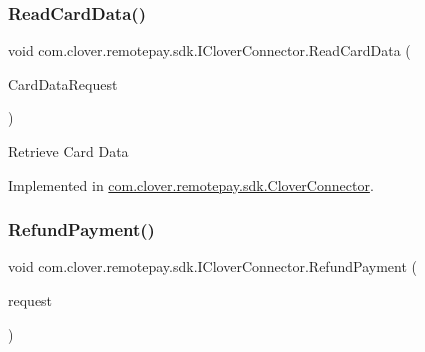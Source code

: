 \mbox{\label{interfacecom_1_1clover_1_1remotepay_1_1sdk_1_1_i_clover_connector_a841db6225c6a5df5e04918d9e2648fd1}} 
\subsubsection{\texorpdfstring{Read\+Card\+Data()}{ReadCardData()}}
{\footnotesize\ttfamily void com.\+clover.\+remotepay.\+sdk.\+I\+Clover\+Connector.\+Read\+Card\+Data (\begin{DoxyParamCaption}\item[{\hyperlink{classcom_1_1clover_1_1remotepay_1_1sdk_1_1_read_card_data_request}{Read\+Card\+Data\+Request}}]{Card\+Data\+Request }\end{DoxyParamCaption})}



Retrieve Card Data 



Implemented in \hyperlink{classcom_1_1clover_1_1remotepay_1_1sdk_1_1_clover_connector_a0901566c92bbce70865b3ae144e42cdc}{com.\+clover.\+remotepay.\+sdk.\+Clover\+Connector}.

\mbox{\label{interfacecom_1_1clover_1_1remotepay_1_1sdk_1_1_i_clover_connector_aaa44684c7bf2c04b88ead61034c7c273}} 
\subsubsection{\texorpdfstring{Refund\+Payment()}{RefundPayment()}}
{\footnotesize\ttfamily void com.\+clover.\+remotepay.\+sdk.\+I\+Clover\+Connector.\+Refund\+Payment (\begin{DoxyParamCaption}\item[{\hyperlink{classcom_1_1clover_1_1remotepay_1_1sdk_1_1_refund_payment_request}{Refund\+Payment\+Request}}]{request }\end{DoxyParamCaption})}



